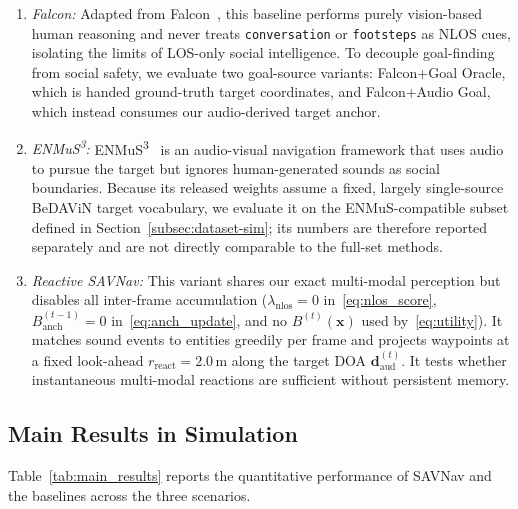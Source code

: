 \begin{enumerate}
	\item \textit{Falcon:} Adapted from Falcon~\cite{CognitionPrecognitionFutureaware2025}, this baseline performs purely vision-based human reasoning and never treats \texttt{conversation} or \texttt{footsteps} as NLOS cues, isolating the limits of LOS-only social intelligence. To decouple goal-finding from social safety, we evaluate two goal-source variants: Falcon+Goal Oracle, which is handed ground-truth target coordinates, and Falcon+Audio Goal, which instead consumes our audio-derived target anchor.
	\item \textit{ENMuS\textsuperscript{3}:} ENMuS\textsuperscript{3}~\cite{AudiovisualNavigationNoisy2025} is an audio-visual navigation framework that uses audio to pursue the target but ignores human-generated sounds as social boundaries. Because its released weights assume a fixed, largely single-source BeDAViN target vocabulary, we evaluate it on the ENMuS-compatible subset defined in Section~\ref{subsec:dataset-sim}; its numbers are therefore reported separately and are not directly comparable to the full-set methods.
	\item \textit{Reactive SAVNav:} This variant shares our exact multi-modal perception but disables all inter-frame accumulation ($\lambda_{\mathrm{nlos}}=0$ in~\eqref{eq:nlos_score}, $B_{\mathrm{anch}}^{(t-1)}=0$ in~\eqref{eq:anch_update}, and no $B^{(t)}(\mathbf{x})$ used by~\eqref{eq:utility}). It matches sound events to entities greedily per frame and projects waypoints at a fixed look-ahead $r_{\mathrm{react}}=2.0\,\mathrm{m}$ along the target DOA $\mathbf{d}_{\mathrm{aud}}^{(t)}$. It tests whether instantaneous multi-modal reactions are sufficient without persistent memory.
\end{enumerate}

\subsection{Main Results in Simulation}
\label{subsec:exp-main}

Table~\ref{tab:main_results} reports the quantitative performance of SAVNav and the baselines across the three scenarios.

